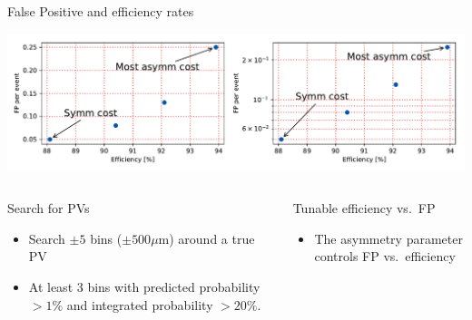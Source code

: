 \begin{frame}{False Positive and efficiency rates}

\includegraphics[width=\textwidth]{images/EffVsFP2.pdf}

  \begin{columns}[t]
  \begin{block}{Search for PVs}
    \begin{itemize}
    	\item Search $ \pm 5 $ bins ($ \pm 500 \mu $m) around a true PV
    	\item At least 3 bins with predicted probability
    	   $ > 1\% $ and
    	   integrated probability $ > 20\%$.
    \end{itemize}
    \end{block}

    \begin{block}{Tunable efficiency vs.\ FP}
    \begin{itemize}
        \item The asymmetry parameter controls FP vs.\ efficiency
    \end{itemize}
  \end{block}
\end{columns}
\end{frame}
